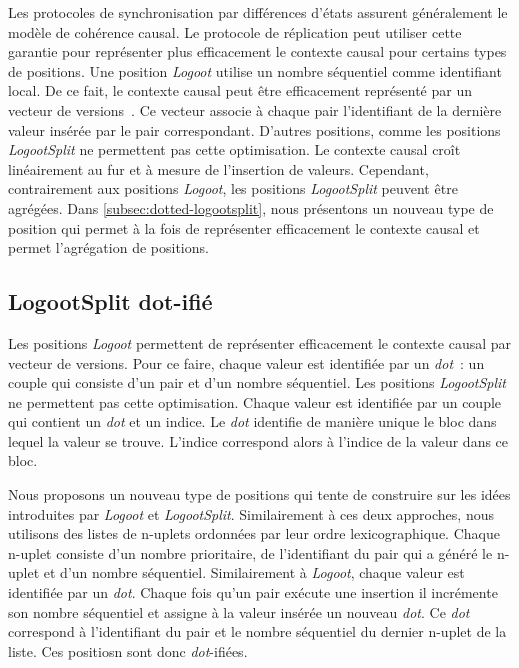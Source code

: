 Les protocoles de synchronisation par différences d'états assurent généralement le modèle de cohérence causal.
Le protocole de réplication peut utiliser cette garantie pour représenter plus efficacement le contexte causal pour certains types de positions.
Une position \emph{Logoot} utilise un nombre séquentiel comme identifiant local.
De ce fait, le contexte causal peut être efficacement représenté par un vecteur de versions~\autocite{parker_1983_versionvector,mattern_1988_timevector}.
Ce vecteur associe à chaque pair l'identifiant de la dernière valeur insérée par le pair correspondant.
D'autres positions, comme les positions \emph{LogootSplit} ne permettent pas cette optimisation.
Le contexte causal croît linéairement au fur et à mesure de l'insertion de valeurs.
Cependant, contrairement aux positions \emph{Logoot}, les positions \emph{LogootSplit} peuvent être agrégées.
Dans \autoref{subsec:dotted-logootsplit}, nous présentons un nouveau type de position qui permet à la fois de représenter efficacement le contexte causal et permet l'agrégation de positions.


\subsection{LogootSplit dot-ifié}\label{subsec:dotted-logootsplit}

Les positions \emph{Logoot} permettent de représenter efficacement le contexte causal par vecteur de versions.
Pour ce faire, chaque valeur est identifiée par un \emph{dot}~: un couple qui consiste d'un pair et d'un nombre séquentiel.
Les positions \emph{LogootSplit} ne permettent pas cette optimisation.
Chaque valeur est identifiée par un couple qui contient un \emph{dot} et un indice.
Le \emph{dot} identifie de manière unique le bloc dans lequel la valeur se trouve.
L'indice correspond alors à l'indice de la valeur dans ce bloc.

Nous proposons un nouveau type de positions qui tente de construire sur les idées introduites par \emph{Logoot} et \emph{LogootSplit}.
Similairement à ces deux approches, nous utilisons des listes de n-uplets ordonnées par leur ordre lexicographique.
Chaque n-uplet consiste d'un nombre prioritaire, de l'identifiant du pair qui a généré le n-uplet et d'un nombre séquentiel. 
Similairement à \emph{Logoot}, chaque valeur est identifiée par un \emph{dot}.
Chaque fois qu'un pair exécute une insertion il incrémente son nombre séquentiel et assigne à la valeur insérée un nouveau \emph{dot}.
Ce \emph{dot} correspond à l'identifiant du pair et le nombre séquentiel du dernier n-uplet de la liste.
Ces positiosn sont donc \emph{dot}-ifiées.

